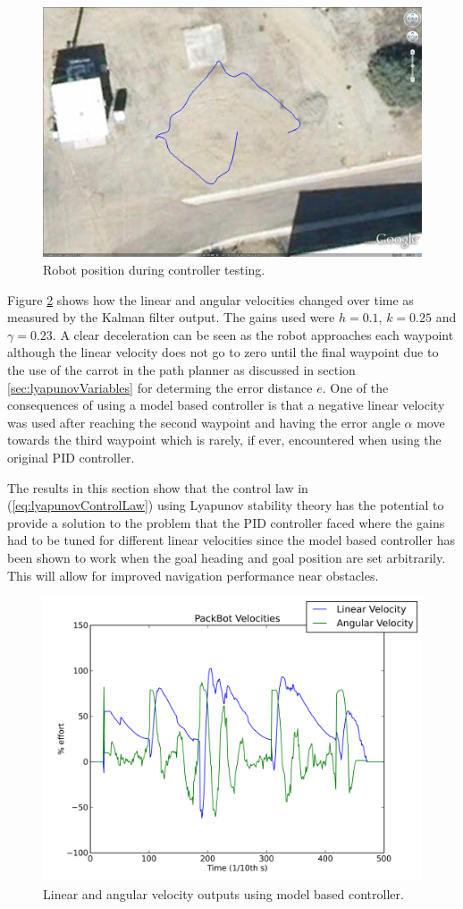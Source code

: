 \begin{figure}[ht!]
	\centering
	\includegraphics[width=.5\textwidth]{images/20100918_1717_GE_KF}
	\caption{Robot position during controller testing.}
	\label{fig:resultsLyapunovGEKF}
\end{figure}

Figure \ref{fig:resultsLyapunovVelocities} shows how the linear and angular velocities changed over time as measured by the Kalman filter output. The gains used were $h=0.1$, $k=0.25$ and $\gamma=0.23$. A clear deceleration can be seen as the robot approaches each waypoint although the linear velocity does not go to zero until the final waypoint due to the use of the carrot in the path planner as discussed in section \ref{sec:lyapunovVariables} for determing the error distance $e$. One of the consequences of using a model based controller is that a negative linear velocity was used after reaching the second waypoint and having the error angle $\alpha$ move towards the third waypoint which is rarely, if ever, encountered when using the original PID controller.

The results in this section show that the control law in (\ref{eq:lyapunovControlLaw}) using Lyapunov stability theory has the potential to provide a solution to the problem that the PID controller faced where the gains had to be tuned for different linear velocities since the model based controller has been shown to work when the goal heading and goal position are set arbitrarily. This will allow for improved navigation performance near obstacles.

\begin{figure}[ht!]
	\centering
	\includegraphics[width=.5\textwidth]{images/20100918_1717_velocities}
	\caption{Linear and angular velocity outputs using model based controller.}
	\label{fig:resultsLyapunovVelocities}
\end{figure}

